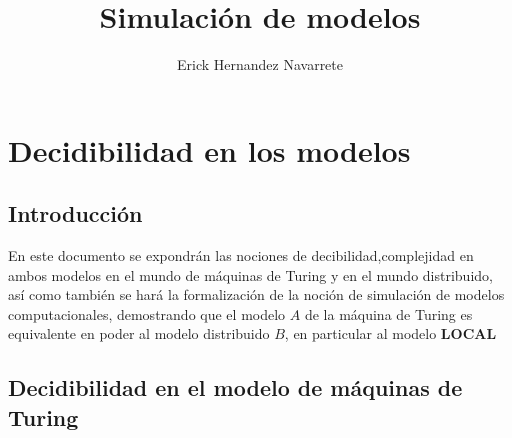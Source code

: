 \documentclass[10pt]{report}
\author{Erick Hernandez Navarrete}
\title{Simulación de modelos}
\begin{document}
    \maketitle
    \tableofcontents{}
    \chapter{Decidibilidad en los modelos}\label{ch:decidibilidad-en-los-modelos}
    \section{Introducción}\label{sec:introducción}
    En este documento se expondrán las nociones de decibilidad,complejidad en ambos modelos %
    en el mundo de máquinas de Turing y en el mundo distribuido,
    así como también se hará la formalización de la noción de simulación de modelos
    computacionales, demostrando que el modelo $A$ de  la máquina de
    Turing es equivalente en poder al modelo distribuido $B$, en particular al modelo \textbf{LOCAL}

    \section{Decidibilidad en el modelo de máquinas de Turing}\label{sec:decidibilidasd-en-el-modelo-de-máquinas-de-turing}
\end{document}
